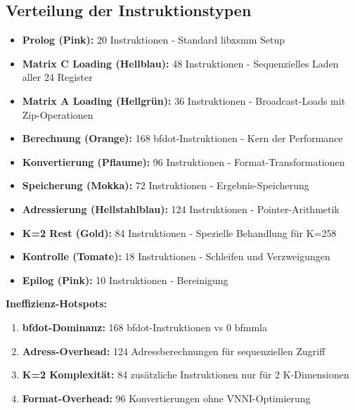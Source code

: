 \documentclass[a4paper,10pt]{article}
\begin{document}
\begin{tcolorbox}[colback=blue!5, title=Strukturelle Erkenntnisse]

\subsection{Verteilung der Instruktionstypen}

\begin{itemize}
\item \textcolor{prologue}{\textbf{Prolog (Pink):}} 20 Instruktionen - Standard libxsmm Setup
\item \textcolor{matrixc}{\textbf{Matrix C Loading (Hellblau):}} 48 Instruktionen - Sequenzielles Laden aller 24 Register
\item \textcolor{matrixa}{\textbf{Matrix A Loading (Hellgrün):}} 36 Instruktionen - Broadcast-Loads mit Zip-Operationen
\item \textcolor{compute}{\textbf{Berechnung (Orange):}} 168 bfdot-Instruktionen - Kern der Performance
\item \textcolor{conversion}{\textbf{Konvertierung (Pflaume):}} 96 Instruktionen - Format-Transformationen
\item \textcolor{storage}{\textbf{Speicherung (Mokka):}} 72 Instruktionen - Ergebnis-Speicherung
\item \textcolor{address}{\textbf{Adressierung (Hellstahlblau):}} 124 Instruktionen - Pointer-Arithmetik
\item \textcolor{remainder}{\textbf{K=2 Rest (Gold):}} 84 Instruktionen - Spezielle Behandlung für K=258
\item \textcolor{control}{\textbf{Kontrolle (Tomate):}} 18 Instruktionen - Schleifen und Verzweigungen
\item \textcolor{epilogue}{\textbf{Epilog (Pink):}} 10 Instruktionen - Bereinigung
\end{itemize}

\end{tcolorbox}

\begin{tcolorbox}[colback=red!5, title=Performance-kritische Beobachtungen]

\textbf{Ineffizienz-Hotspots:}
\begin{enumerate}
\item \textcolor{compute}{\textbf{bfdot-Dominanz:}} 168 bfdot-Instruktionen vs 0 bfmmla
\item \textcolor{address}{\textbf{Adress-Overhead:}} 124 Adressberechnungen für sequenziellen Zugriff
\item \textcolor{remainder}{\textbf{K=2 Komplexität:}} 84 zusätzliche Instruktionen nur für 2 K-Dimensionen
\item \textcolor{conversion}{\textbf{Format-Overhead:}} 96 Konvertierungen ohne VNNI-Optimierung
\end{enumerate}

\end{tcolorbox}
\end{document}

